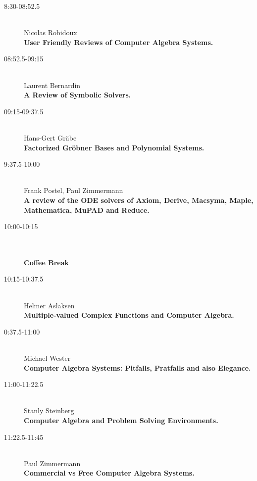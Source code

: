 \begin{description}
\item[8:30-08:52.5] \ \\
  Nicolas Robidoux\\
  {\bf User Friendly Reviews of Computer Algebra Systems.} 
\item[08:52.5-09:15] \ \\
  Laurent Bernardin\\
  {\bf A Review of Symbolic Solvers.} 
\item[09:15-09:37.5] \ \\
  Hans-Gert Gr\"abe\\
  {\bf Factorized Gr\"obner Bases and Polynomial Systems.} 
\item[9:37.5-10:00] \ \\
  Frank Postel, Paul Zimmermann\\
  {\bf A review of the ODE solvers of Axiom, Derive, Macsyma, Maple, Mathematica,
    MuPAD and Reduce.} 
\item[10:00-10:15 ] \ \\
  \\
  {\bf Coffee Break} 
\item[10:15-10:37.5] \ \\
  Helmer Aslaksen\\
  {\bf Multiple-valued Complex Functions and Computer Algebra.} 
\item[0:37.5-11:00] \ \\
  Michael Wester\\
  {\bf Computer Algebra Systems: Pitfalls, Pratfalls and also Elegance.} 
\item[11:00-11:22.5] \ \\
  Stanly Steinberg\\
  {\bf Computer Algebra and Problem Solving Environments.} 
\item[11:22.5-11:45] \ \\
  Paul Zimmermann\\
  {\bf Commercial vs Free Computer Algebra Systems.} 
\end{description}

